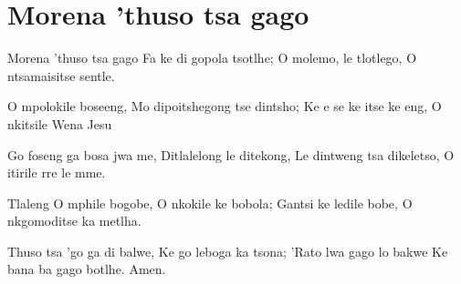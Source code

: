 \starttocol
\chapter{Morena 'thuso tsa gago}
\nexttocol
\hfill{\it }
\stoptocol
\starttocol
\startlines
{\sc Morena} 'thuso tsa gago
Fa ke di gopola tsotlhe;
O molemo, le tlotlego,
O ntsamaisitse sentle.

O mpolokile boseeng,
Mo dipoitshegong tse dintsho;
Ke e se ke itse ke eng,
O nkitsile Wena Jesu

Go foseng ga bosa jwa me,
Ditlalelong le ditekong,
Le dintweng tsa dikeletso,
O itirile rre le mme.

Tlaleng O mphile bogobe,
O nkokile ke bobola;
Gantsi ke ledile bobe,
O nkgomoditse ka metlha.

Thuso tsa 'go ga di balwe,
Ke go leboga ka tsona;
'Rato lwa gago lo bakwe
Ke bana ba gago botlhe. 
          \hfill Amen.~~~~~~~~~  

\stoplines
\nexttocol

\stoptocol
